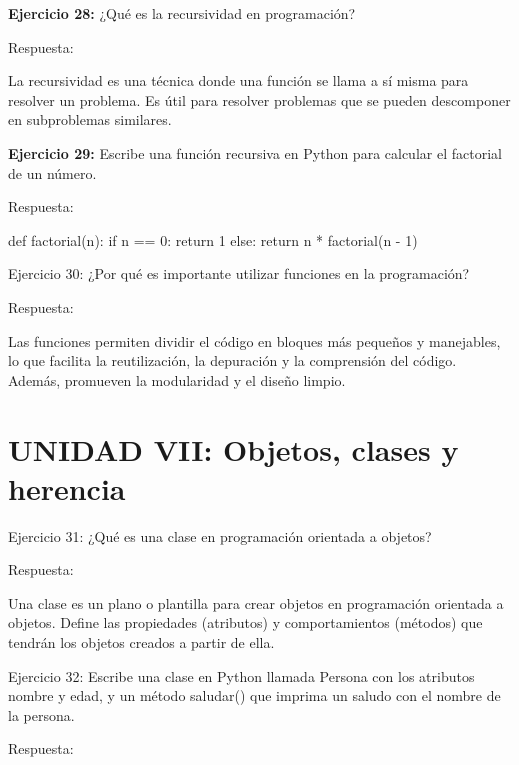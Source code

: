 \documentclass[
  a4paper,
  onepage,
  openany]{scrreprt}
\newenvironment{Shaded}{\begin{snugshade}}{\end{snugshade}}
\newcommand{\ControlFlowTok}[1]{\textcolor[rgb]{0.00,0.23,0.31}{#1}}
\newcommand{\DecValTok}[1]{\textcolor[rgb]{0.68,0.00,0.00}{#1}}
\newcommand{\KeywordTok}[1]{\textcolor[rgb]{0.00,0.23,0.31}{#1}}
\newcommand{\NormalTok}[1]{\textcolor[rgb]{0.00,0.23,0.31}{#1}}
\newcommand{\OperatorTok}[1]{\textcolor[rgb]{0.37,0.37,0.37}{#1}}
\begin{document}
\textbf{Ejercicio 28:} ¿Qué es la recursividad en programación?

Respuesta:

La recursividad es una técnica donde una función se llama a sí misma
para resolver un problema. Es útil para resolver problemas que se pueden
descomponer en subproblemas similares.

\textbf{Ejercicio 29:} Escribe una función recursiva en Python para
calcular el factorial de un número.

Respuesta:

\begin{Shaded}
\begin{Highlighting}[]
\KeywordTok{def}\NormalTok{ factorial(n):}
    \ControlFlowTok{if}\NormalTok{ n }\OperatorTok{==} \DecValTok{0}\NormalTok{:}
        \ControlFlowTok{return} \DecValTok{1}
    \ControlFlowTok{else}\NormalTok{:}
        \ControlFlowTok{return}\NormalTok{ n }\OperatorTok{*}\NormalTok{ factorial(n }\OperatorTok{{-}} \DecValTok{1}\NormalTok{)}
\end{Highlighting}
\end{Shaded}

Ejercicio 30: ¿Por qué es importante utilizar funciones en la
programación?

Respuesta:

Las funciones permiten dividir el código en bloques más pequeños y
manejables, lo que facilita la reutilización, la depuración y la
comprensión del código. Además, promueven la modularidad y el diseño
limpio.

\hypertarget{unidad-vii-objetos-clases-y-herencia}{%
\section{UNIDAD VII: Objetos, clases y
herencia}\label{unidad-vii-objetos-clases-y-herencia}}

Ejercicio 31: ¿Qué es una clase en programación orientada a objetos?

Respuesta:

Una clase es un plano o plantilla para crear objetos en programación
orientada a objetos. Define las propiedades (atributos) y
comportamientos (métodos) que tendrán los objetos creados a partir de
ella.

Ejercicio 32: Escribe una clase en Python llamada Persona con los
atributos nombre y edad, y un método saludar() que imprima un saludo con
el nombre de la persona.

Respuesta:
\end{document}
